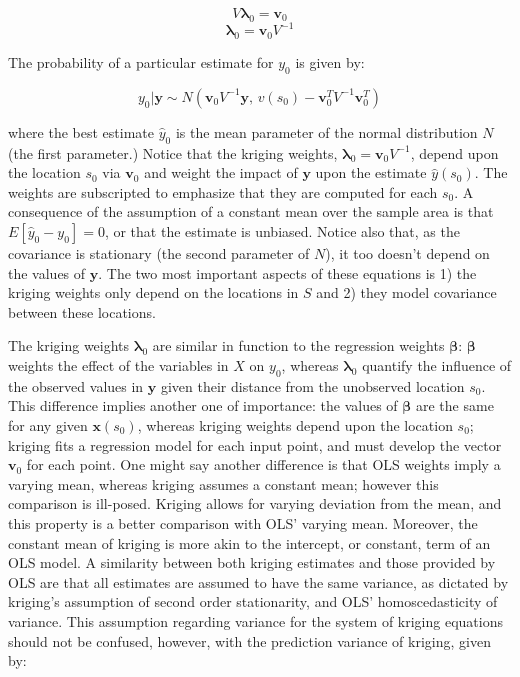 \documentclass[]{interact}
\theoremstyle{plain}%
\theoremstyle{definition}
\theoremstyle{remark}
\begin{document}
\[V \bm{\lambda}_0 = \bm{v}_0 \]
\[ \bm{\lambda}_0 = \bm{v}_0 V^{-1} \]

The probability of a particular estimate for $y_0$ is given by:

\begin{equation} \label{eq:posterior}
  y_0 | \bm{y} \sim N(\bm{v}_0 V^{-1} \bm{y}, \, v(s_0)-\bm{v}_0^T V^{-1} \bm{v}_0^T)
\end{equation}

where the best estimate $\hat{y}_0$ is the mean parameter of the normal distribution $N$ (the first parameter.)  Notice that the kriging weights, $\bm{\lambda}_0=\bm{v}_0 V^{-1}$, depend upon the location $s_0$ via $\bm{v}_0$ and weight the impact of $\bm{y}$ upon the estimate $\hat{y}(s_0)$.  The weights are subscripted to emphasize that they are computed for each $s_0$.  A consequence of the assumption of a constant mean over the sample area is that $E[\hat{y}_0 - y_0]=0$, or that the estimate is unbiased.  Notice also that, as the covariance is stationary (the second parameter of $N$), it too doesn't depend on the values of $\bm{y}$.  The two most important aspects of these equations is 1) the kriging weights only depend on the locations in $S$ and 2) they model covariance between these locations.

The kriging weights $\bm{\lambda}_0$ are similar in function to the regression weights $\bm{\beta}$: $\bm{\beta}$ weights the effect of the variables in $X$ on $y_0$, whereas $\bm{\lambda}_0$ quantify the influence of the observed values in $\bm{y}$ given their distance from the unobserved location $s_0$.  This difference implies another one of importance: the values of $\bm{\beta}$ are the same for any given $\bm{x}(s_0)$, whereas kriging weights depend upon the location $s_0$; kriging fits a regression model for each input point, and must develop the vector $\bm{v}_0$ for each point.  One might say another difference is that OLS weights imply a varying mean, whereas kriging assumes a constant mean; however this comparison is ill-posed.  Kriging allows for varying deviation from the mean, and this property is a better comparison with OLS' varying mean.  Moreover, the constant mean of kriging is more akin to the intercept, or constant, term of an OLS model.  A similarity between both kriging estimates and those provided by OLS are that all estimates are assumed to have the same variance, as dictated by kriging's assumption of second order stationarity, and OLS' homoscedasticity of variance.  This assumption regarding variance for the system of kriging equations should not be confused, however, with the prediction variance of kriging, given by:
\end{document}
